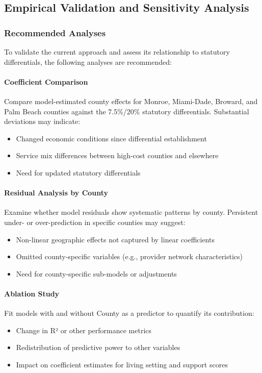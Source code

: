 \subsection{Empirical Validation and Sensitivity Analysis}
\label{subsec:county-validation}

\subsubsection{Recommended Analyses}

To validate the current approach and assess its relationship to statutory differentials, the following analyses are recommended:

\paragraph{Coefficient Comparison}
Compare model-estimated county effects for Monroe, Miami-Dade, Broward, and Palm Beach counties against the 7.5\%/20\% statutory differentials. Substantial deviations may indicate:
\begin{itemize}
    \item Changed economic conditions since differential establishment
    \item Service mix differences between high-cost counties and elsewhere
    \item Need for updated statutory differentials
\end{itemize}

\paragraph{Residual Analysis by County}
Examine whether model residuals show systematic patterns by county. Persistent under- or over-prediction in specific counties may suggest:
\begin{itemize}
    \item Non-linear geographic effects not captured by linear coefficients
    \item Omitted county-specific variables (e.g., provider network characteristics)
    \item Need for county-specific sub-models or adjustments
\end{itemize}

\paragraph{Ablation Study}
Fit models with and without County as a predictor to quantify its contribution:
\begin{itemize}
    \item Change in R² or other performance metrics
    \item Redistribution of predictive power to other variables
    \item Impact on coefficient estimates for living setting and support scores
\end{itemize}

